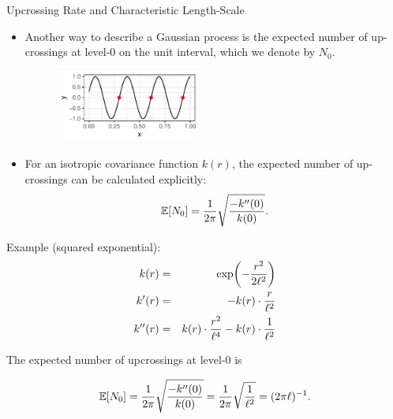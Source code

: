 \begin{frame}[c,allowframebreaks]{Upcrossing Rate and Characteristic Length-Scale}

\begin{itemize}
\item Another way to describe a Gaussian process is the expected number of up-crossings at level-0 on the unit interval, which we denote by $N_0$.
\vspace{3mm}
\begin{figure}
	\includegraphics[width = 0.45\textwidth]{figure/upcrossings-1.pdf}
\end{figure}

\item For an isotropic covariance function $k(r)$, the expected number of up-crossings can be calculated explicitly:
$$
\mathbb{E}[N_0] = \frac{1}{2\pi} \sqrt{\frac{- k^{\prime\prime}(0)}{k(0)}}.
$$

\end{itemize}


\framebreak

Example (squared exponential):
\vspace{-3mm}
\begin{eqnarray*}
k(r) &=& \exp\biggl(-\frac{r^2}{2\ell^2}\biggr)\\
k^\prime(r) &=& - k(r) \cdot \frac{r}{\ell^2} \\
k^{\prime\prime}(r) &=&  k(r) \cdot \frac{r^2}{\ell^4} - k(r) \cdot \frac{1}{\ell^2}
\end{eqnarray*}

\vspace{5mm}
The expected number of upcrossings at level-0 is

$$
\operatorname*{\mathbb{E}}[N_0] = \frac{1}{2\pi} \sqrt{\frac{- k^{\prime\prime}(0)}{k(0)}} = \frac{1}{2\pi} \sqrt{\frac{1}{\ell^2}} = (2\pi \ell)^{-1}.
$$


\end{frame}


